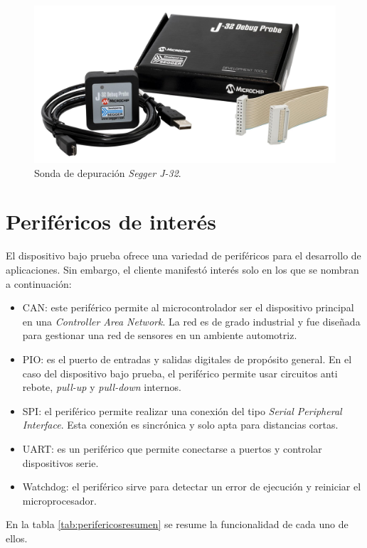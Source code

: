 \begin{figure}[htbp]
	\centering
	\includegraphics[width=.8\textwidth]{./Figures/segger.jpg}
    \caption{Sonda de depuración \emph{Segger J-32}\protect\footnotemark.}
	\label{fig:sonda}
\end{figure}

\section{Periféricos de interés}
\label{sec:perifericos}

El dispositivo bajo prueba ofrece una variedad de periféricos para el desarrollo de aplicaciones.
Sin embargo, el cliente manifestó interés solo en los que se nombran a continuación:
\begin{itemize}
    \item CAN: este periférico permite al microcontrolador ser el dispositivo principal en una \emph{Controller Area Network}. La red es de grado industrial y fue diseñada para gestionar una red de sensores en un ambiente automotriz.
    \item PIO: es el puerto de entradas y salidas digitales de propósito general. En el caso del dispositivo bajo prueba, el periférico permite usar circuitos anti rebote, \emph{pull-up} y \emph{pull-down} internos. 
    \item SPI: el periférico permite realizar una conexión del tipo \emph{Serial Peripheral Interface}. Esta conexión es sincrónica y solo apta para distancias cortas.
    \item UART: es un periférico que permite conectarse a puertos y controlar dispositivos serie.
    \item Watchdog: el periférico sirve para detectar un error de ejecución y reiniciar el microprocesador.
\end{itemize}

En la tabla \ref{tab:perifericosresumen} se resume la funcionalidad de cada uno de ellos.

